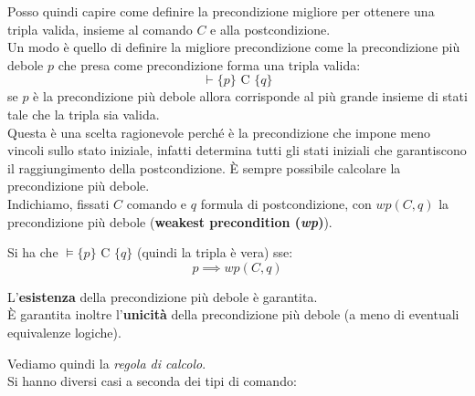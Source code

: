 \documentclass[a4paper,12pt, oneside]{book}
\begin{document}
Posso quindi capire come definire la precondizione migliore per ottenere una
tripla valida, insieme al comando $C$ e alla postcondizione.\\
Un modo è quello di definire la migliore precondizione come la precondizione più
debole $p$ che presa come precondizione forma una tripla valida:
\[\vdash \{p\}\mbox{ C }\{q\}\]
se $p$ è la precondizione più debole allora corrisponde al più grande insieme di
stati tale che la tripla sia valida.\\
Questa è una scelta ragionevole perché è la precondizione che impone meno
vincoli sullo stato iniziale, infatti determina tutti gli stati iniziali che
garantiscono il raggiungimento della postcondizione. È sempre possibile
calcolare la precondizione più debole.\\
Indichiamo, fissati $C$ comando e $q$ formula di postcondizione, con $wp(C, q)$
la precondizione più debole (\textbf{weakest precondition (\textit{wp})}).
\begin{teorema}
  Si ha che $\vDash\{p\}\mbox{ C }\{q\}$ (quindi la tripla è vera) sse:
  \[p\implies wp(C,q)\]
\end{teorema}
\begin{teorema}
  L'\textbf{esistenza} della precondizione più debole è garantita.\\
  È garantita inoltre l'\textbf{unicità} della precondizione più debole (a meno
  di eventuali equivalenze logiche).
\end{teorema}
Vediamo quindi la \textit{regola di calcolo}.\\
Si hanno diversi casi a seconda dei tipi di comando:
\end{document}
